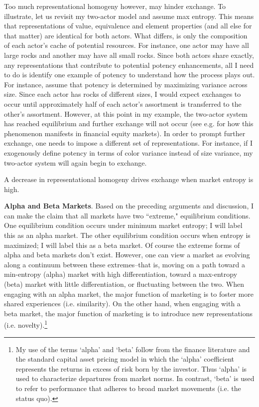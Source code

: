 Too much representational homogeny however, may hinder exchange. To illustrate, let us revisit my two-actor model and assume max entropy. This means that representations of value, equivalence and element properties (and all else for that matter) are identical for both actors. What differs, is only the composition of each actor's cache of potential resources. For instance, one actor may have all large rocks and another may have all small rocks. Since both actors share exactly, any representations that contribute to potential potency enhancements, all I need to do is identify one example of potency to understand how the process plays out. For instance, assume that potency is determined by maximizing variance across size. Since each actor has rocks of different sizes, I would expect exchanges to occur until approximately half of each actor's assortment is transferred to the other's assortment. However, at this point in my example, the two-actor system has reached equilibrium and further exchange will not occur (see e.g. \citet{milgrom1982} for how this phenomenon manifests in financial equity markets). In order to prompt further exchange, one needs to impose a different set of representations. For instance, if I exogenously define potency in terms of color variance instead of size variance, my two-actor system will again begin to exchange.
 
\begin{prop}
A decrease in representational homogeny drives exchange when market entropy is high.
\end{prop}

\textbf{Alpha and Beta Markets}.
Based on the preceding arguments and discussion, I can make the claim that all markets have two ``extreme," equilibrium conditions. One equilibrium condition occurs under minimum market entropy; I will label this as an alpha market. The other equilibrium condition occurs when entropy is maximized; I will label this as a beta market. Of course the extreme forms of alpha and beta markets don't exist. However, one can view a market as evolving along a continuum between these extremes--that is, moving on a path toward a min-entropy (alpha) market with high differentiation, toward a max-entropy (beta) market with little differentiation, or fluctuating between the two. When engaging with an alpha market, the major function of marketing is to foster more shared experiences (i.e. similarity). On the other hand, when engaging with a beta market, the major function of marketing is to introduce new representations (i.e. novelty).\footnote{My use of the terms `alpha' and `beta' follow from the finance literature and the standard capital asset pricing model in which the `alpha' coefficient represents the returns in excess of risk born by the investor. Thus `alpha' is used to characterize departures from market norms. In contrast, `beta' is used to refer to performance that adheres to broad market movements (i.e. the status quo).}
 
